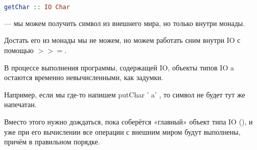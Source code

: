 \begin{lstlisting}[language=Haskell]
	getChar :: IO Char
\end{lstlisting} --- мы можем получить символ из внешнего мира, но только внутри монады.

Достать его из монады мы не можем, но можем работать сним внутри IO с помощью $>>=$.

В процессе выполнения программы, содержащей IO, объекты типов IO a остаются временно невычисленными, как задумки.

Например, если мы где-то напишем putChar ' a' , то символ не будет тут же напечатан.

Вместо этого нужно дождаться, пока соберётся «главный» объект типа IO (), и уже при его вычислении все операции с внешним миром будут выполнены, причём в правильном порядке.
